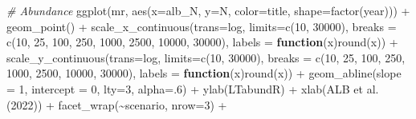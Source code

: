 \documentclass[
]{book}
\newenvironment{Shaded}{\begin{snugshade}}{\end{snugshade}}
\newcommand{\AttributeTok}[1]{\textcolor[rgb]{0.77,0.63,0.00}{#1}}
\newcommand{\CommentTok}[1]{\textcolor[rgb]{0.56,0.35,0.01}{\textit{#1}}}
\newcommand{\ControlFlowTok}[1]{\textcolor[rgb]{0.13,0.29,0.53}{\textbf{#1}}}
\newcommand{\DecValTok}[1]{\textcolor[rgb]{0.00,0.00,0.81}{#1}}
\newcommand{\FunctionTok}[1]{\textcolor[rgb]{0.00,0.00,0.00}{#1}}
\newcommand{\NormalTok}[1]{#1}
\newcommand{\SpecialCharTok}[1]{\textcolor[rgb]{0.00,0.00,0.00}{#1}}
\newcommand{\StringTok}[1]{\textcolor[rgb]{0.31,0.60,0.02}{#1}}
\begin{document}
\begin{Shaded}
\begin{Highlighting}[]
\CommentTok{\# Abundance}
\FunctionTok{ggplot}\NormalTok{(mr,}
       \FunctionTok{aes}\NormalTok{(}\AttributeTok{x=}\NormalTok{alb\_N, }\AttributeTok{y=}\NormalTok{N, }
           \AttributeTok{color=}\NormalTok{title, }\AttributeTok{shape=}\FunctionTok{factor}\NormalTok{(year))) }\SpecialCharTok{+}
    \FunctionTok{geom\_point}\NormalTok{() }\SpecialCharTok{+}
    \FunctionTok{scale\_x\_continuous}\NormalTok{(}\AttributeTok{trans=}\StringTok{\textquotesingle{}log\textquotesingle{}}\NormalTok{, }
                       \AttributeTok{limits=}\FunctionTok{c}\NormalTok{(}\DecValTok{10}\NormalTok{, }\DecValTok{30000}\NormalTok{), }
                       \AttributeTok{breaks =} \FunctionTok{c}\NormalTok{(}\DecValTok{10}\NormalTok{, }\DecValTok{25}\NormalTok{, }\DecValTok{100}\NormalTok{, }\DecValTok{250}\NormalTok{, }\DecValTok{1000}\NormalTok{, }\DecValTok{2500}\NormalTok{, }\DecValTok{10000}\NormalTok{, }\DecValTok{30000}\NormalTok{),}
                       \AttributeTok{labels =} \ControlFlowTok{function}\NormalTok{(x)}\FunctionTok{round}\NormalTok{(x)) }\SpecialCharTok{+}
    \FunctionTok{scale\_y\_continuous}\NormalTok{(}\AttributeTok{trans=}\StringTok{\textquotesingle{}log\textquotesingle{}}\NormalTok{, }
                       \AttributeTok{limits=}\FunctionTok{c}\NormalTok{(}\DecValTok{10}\NormalTok{, }\DecValTok{30000}\NormalTok{), }
                       \AttributeTok{breaks =} \FunctionTok{c}\NormalTok{(}\DecValTok{10}\NormalTok{, }\DecValTok{25}\NormalTok{, }\DecValTok{100}\NormalTok{, }\DecValTok{250}\NormalTok{, }\DecValTok{1000}\NormalTok{, }\DecValTok{2500}\NormalTok{, }\DecValTok{10000}\NormalTok{, }\DecValTok{30000}\NormalTok{),}
                       \AttributeTok{labels =} \ControlFlowTok{function}\NormalTok{(x)}\FunctionTok{round}\NormalTok{(x)) }\SpecialCharTok{+}
    \FunctionTok{geom\_abline}\NormalTok{(}\AttributeTok{slope =} \DecValTok{1}\NormalTok{, }\AttributeTok{intercept =} \DecValTok{0}\NormalTok{, }\AttributeTok{lty=}\DecValTok{3}\NormalTok{, }\AttributeTok{alpha=}\NormalTok{.}\DecValTok{6}\NormalTok{) }\SpecialCharTok{+}
    \FunctionTok{ylab}\NormalTok{(}\StringTok{\textquotesingle{}LTabundR\textquotesingle{}}\NormalTok{) }\SpecialCharTok{+} \FunctionTok{xlab}\NormalTok{(}\StringTok{\textquotesingle{}ALB et al. (2022)\textquotesingle{}}\NormalTok{) }\SpecialCharTok{+}
  \FunctionTok{facet\_wrap}\NormalTok{(}\SpecialCharTok{\textasciitilde{}}\NormalTok{scenario, }\AttributeTok{nrow=}\DecValTok{3}\NormalTok{) }\SpecialCharTok{+} 

\end{Highlighting}
\end{Shaded}
\end{document}

